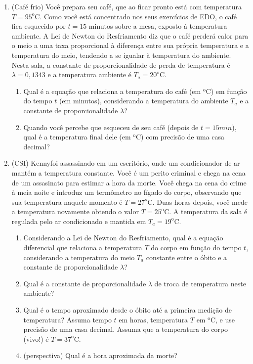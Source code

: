 \documentclass[a4paper]{article}
\begin{document}
\begin{enumerate}
\item (Café frio) Você prepara seu café, que ao ficar pronto está com
  temperatura $T=95^\text{o}$C. Como você está concentrado nos seus
  exercícios de EDO, o café fica esquecido por $t=15$ minutos sobre a
  mesa, exposto à temperatura ambiente. A Lei de Newton do
  Resfriamento \cite{NewtonResfriamento} diz que o café perderá calor
  para o meio a uma taxa proporcional à diferença entre sua própria
  temperatura e a temperatura do meio, tendendo a se igualar à
  temperatura do ambiente. Nesta sala, a constante de
  proporcionalidade de perda de temperatura é $\lambda = 0,1343$ e a
  temperatura ambiente é $T_a=20^\text{o}$C.

  \begin{enumerate}
  \item Qual é a equação que relaciona a temperatura do café (em
    $^\text{o}$C) em função do tempo $t$ (em minutos), considerando a
    temperatura do ambiente $T_a$ e a constante de proporcionalidade
    $\lambda$?
  \item Quando você percebe que esqueceu de seu café (depois de
    $t=15min$), qual é a temperatura final dele (em $^\text{o}$C) com
    precisão de uma casa decimal?
  \end{enumerate}

\item (CSI) Kenny\circledR foi assassinado em um escritório, onde um
  condicionador de ar mantém a temperatura constante. Você é um perito
  criminal e chega na cena de um assasinato para estimar a hora da
  morte. Você chega na cena do crime à meia noite e introduz um
  termômetro no fígado do corpo, observando que sua temperatura
  naquele momento é $T=27^o$C. Duas horas depois, você mede a
  temperatura novamente obtendo o valor $T=25^\text{o}$C. A
  temperatura da sala é regulada pelo ar condicionado e mantida em
  $T_a=19^\text{o}$C. \cite{CSI}

  \begin{enumerate}
  \item Considerando a Lei de Newton do Resfriamento, qual é a equação
    diferencial que relaciona a temperatura $T$ do corpo em função do
    tempo $t$, considerando a temperatura do meio $T_a$ constante
    entre o óbito e a constante de proporcionalidade $\lambda$?
  \item Qual é a constante de proporcionalidade $\lambda$ de troca de
    temperatura neste ambiente?
  \item Qual é o tempo aproximado desde o óbito até a primeira medição
    de temperatura? Assuma tempo $t$ em horas, temperatura $T$ em
    $^\text{o}$C, e use precisão de uma casa decimal. Assuma que a
    temperatura do corpo (vivo!) é $T=37^\text{o}$C.
  \item (perspectiva) Qual é a hora aproximada da morte?
  \end{enumerate}


\end{enumerate}
\end{document}
